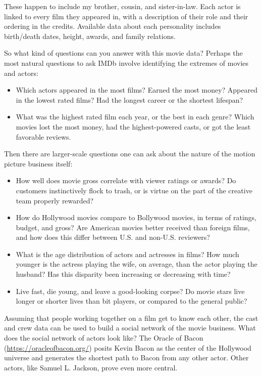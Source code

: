\documentclass[10pt]{article}
\begin{document}
These happen to include my brother, cousin, and sister-in-law. Each actor is linked to every film they appeared in, with a description of their role and their ordering in the credits. Available data about each personality includes birth/death dates, height, awards, and family relations.

So what kind of questions can you answer with this movie data? Perhaps the most natural questions to ask IMDb involve identifying the extremes of movies and actors:

\begin{itemize}
  \item Which actors appeared in the most films? Earned the most money? Appeared in the lowest rated films? Had the longest career or the shortest lifespan?
  \item What was the highest rated film each year, or the best in each genre? Which movies lost the most money, had the highest-powered casts, or got the least favorable reviews.
\end{itemize}

Then there are larger-scale questions one can ask about the nature of the motion picture business itself:

\begin{itemize}
  \item How well does movie gross correlate with viewer ratings or awards? Do customers instinctively flock to trash, or is virtue on the part of the creative team properly rewarded?
  \item How do Hollywood movies compare to Bollywood movies, in terms of ratings, budget, and gross? Are American movies better received than foreign films, and how does this differ between U.S. and non-U.S. reviewers?
  \item What is the age distribution of actors and actresses in films? How much younger is the actress playing the wife, on average, than the actor playing the husband? Has this disparity been increasing or decreasing with time?
  \item Live fast, die young, and leave a good-looking corpse? Do movie stars live longer or shorter lives than bit players, or compared to the general public?
\end{itemize}

Assuming that people working together on a film get to know each other, the cast and crew data can be used to build a social network of the movie business. What does the social network of actors look like? The Oracle of Bacon (\href{https://oracleofbacon.org/}{https://oracleofbacon.org/}) posits Kevin Bacon as the center of the Hollywood universe and generates the shortest path to Bacon from any other actor. Other actors, like Samuel L. Jackson, prove even more central.
\end{document}
